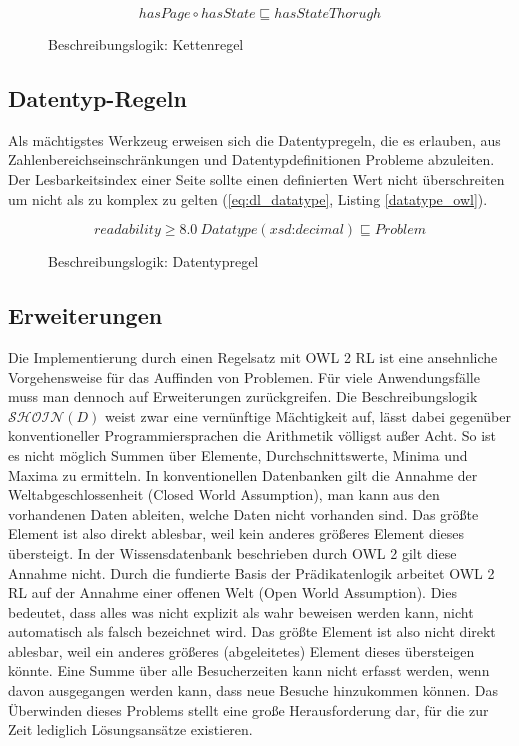 \documentclass[runningheads,a4paper]{llncs}
\begin{document}
\begin{figure}
\begin{equation}
hasPage \circ hasState \sqsubseteq hasStateThorugh
\label{eq:dl_list}
\end{equation}
\caption{Beschreibungslogik: Kettenregel}
\end{figure}



\subsection{Datentyp-Regeln}
Als mächtigstes Werkzeug erweisen sich die Datentypregeln, die es erlauben, aus Zahlenbereichseinschränkungen und Datentypdefinitionen Probleme abzuleiten. 
Der Lesbarkeitsindex einer Seite sollte einen definierten Wert nicht überschreiten um nicht als zu komplex zu gelten (\eqref{eq:dl_datatype}, Listing \ref{datatype_owl}).


\begin{figure}
\begin{equation}
readability \geq 8.0\ Datatype(\textit{xsd:decimal}) \sqsubseteq Problem
\label{eq:dl_datatype}
\end{equation}
\caption{Beschreibungslogik: Datentypregel}
\end{figure}



\subsection{Erweiterungen}
Die Implementierung durch einen Regelsatz mit OWL 2 RL ist eine ansehnliche Vorgehensweise für das Auffinden von Problemen. 
Für viele Anwendungsfälle muss man dennoch auf Erweiterungen zurückgreifen. 
Die Beschreibungslogik \(\mathcal{SHOIN}(D)\) weist zwar eine vernünftige Mächtigkeit auf, lässt dabei gegenüber konventioneller Programmiersprachen die Arithmetik völligst außer Acht. 
So ist es nicht möglich Summen über Elemente, Durchschnittswerte, Minima und Maxima zu ermitteln. 
In konventionellen Datenbanken gilt die Annahme der Weltabgeschlossenheit (Closed World Assumption), man kann aus den vorhandenen Daten ableiten, welche Daten nicht vorhanden sind. 
Das größte Element ist also direkt ablesbar, weil kein anderes größeres Element dieses übersteigt. 
In der Wissensdatenbank beschrieben durch OWL 2 gilt diese Annahme nicht. 
Durch die fundierte Basis der Prädikatenlogik arbeitet OWL 2 RL auf der Annahme einer offenen Welt (Open World Assumption). 
Dies bedeutet, dass alles was nicht explizit als wahr beweisen werden kann, nicht automatisch als falsch bezeichnet wird. 
Das größte Element ist also nicht direkt ablesbar, weil ein anderes größeres (abgeleitetes) Element dieses übersteigen könnte. 
Eine Summe über alle Besucherzeiten kann nicht erfasst werden, wenn davon ausgegangen werden kann, dass neue Besuche hinzukommen können.
Das Überwinden dieses Problems stellt eine große Herausforderung dar, für die zur Zeit lediglich Lösungsansätze existieren. 
\end{document}
